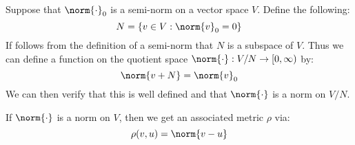 \documentclass[crop=false,class=article,oneside]{standalone}
\begin{document}
            \begin{lexample}
                Suppose that $\norm{\cdot}_{0}$ is a semi-norm
                on a vector space $V$. Define the following:
                \begin{equation}
                    N=\{v\in{V}:\norm{v}_{0}=0\}
                \end{equation}
                If follows from the definition of a semi-norm that
                $N$ is a subspace of $V$. Thus we can define a
                function on the quotient space
                $\norm{\cdot}:V/N\rightarrow[0,\infty)$ by:
                \begin{equation}
                    \norm{v+N}=\norm{v}_{0}
                \end{equation}
                We can then verify that this is well defined and
                that $\norm{\cdot}$ is a norm on $V/N$.
            \end{lexample}
            If $\norm{\cdot}$ is a norm on $V$, then we get an
            associated metric $\rho$ via:
            \begin{equation}
                \rho(v,u)=\norm{v-u}
            \end{equation}
\end{document}
